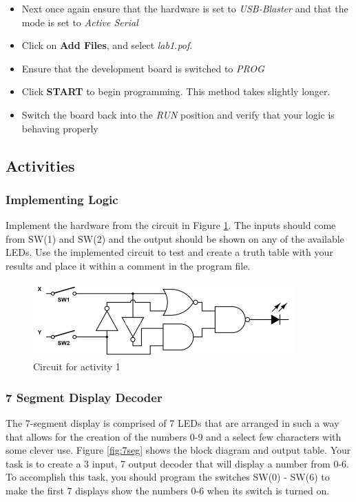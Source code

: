 \begin{enumerate}
\begin{itemize}
	\item Next once again ensure that the hardware is set to \emph{USB-Blaster} and that the mode is set to \emph{Active Serial}
	\item Click on {\bf Add Files}, and select \emph{lab1.pof}. 
	\item Ensure that the development board is switched to \emph{PROG}
	\item Click {\bf START} to begin programming. This method takes slightly longer.
	\item Switch the board back into the \emph{RUN} position and verify that your logic is behaving properly
	\end{itemize}

\end{enumerate}
\subsection{Activities}

\subsubsection{Implementing Logic}

Implement the hardware from the circuit in Figure \ref{fig:circuit1}. The inputs should come from SW(1) and SW(2) and the output should be shown on any of the available LEDs. Use the implemented circuit to test and create a truth table with your results and place it within a comment in the program file.

\begin{figure}[H]
	\centering
	\includegraphics[width=100mm]{Lab1/figures/circuit1.png}
	\caption{Circuit for activity 1}
	\label{fig:circuit1}
\end{figure}

\subsubsection{7 Segment Display Decoder}

The 7-segment display is comprised of 7 LEDs that are arranged in such a way that allows for the creation of the numbers 0-9 and a select few characters with some clever use. Figure \ref{fig:7seg} shows the block diagram and output table. Your task is to create a 3 input, 7 output decoder that will display a number from 0-6. To accomplish this task, you should program the switches SW(0) - SW(6) to make the first 7 displays show the numbers 0-6 when its switch is turned on.

